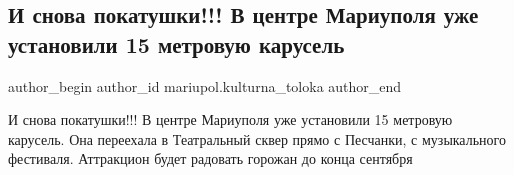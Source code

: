  
 
 
 
 

\subsection{И снова покатушки!!! В центре Мариуполя уже установили 15 метровую карусель}
\label{sec:13_08_2019.fb.mariupol.kulturna_toloka.1.i_snova_pokatushki_}

\ifcmt
 author_begin
   author_id mariupol.kulturna_toloka
 author_end
\fi

И снова покатушки!!! В центре Мариуполя уже установили 15 метровую карусель.
Она переехала в Театральный сквер прямо с Песчанки, с музыкального фестиваля.
Аттракцион будет радовать горожан до конца сентября

